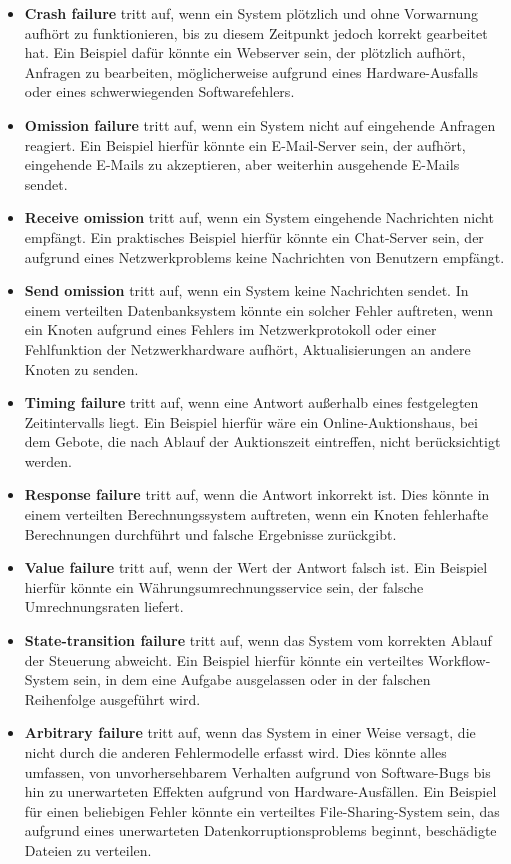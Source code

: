 \documentclass[../vs-script-first-v01.tex]{subfiles}
\begin{document}
\begin{itemize}
\item \textbf{Crash failure} tritt auf, wenn ein System plötzlich und ohne Vorwarnung aufhört zu funktionieren, bis zu diesem Zeitpunkt jedoch korrekt gearbeitet hat. Ein Beispiel dafür könnte ein Webserver sein, der plötzlich aufhört, Anfragen zu bearbeiten, möglicherweise aufgrund eines Hardware-Ausfalls oder eines schwerwiegenden Softwarefehlers.
\item \textbf{Omission failure} tritt auf, wenn ein System nicht auf eingehende Anfragen reagiert. Ein Beispiel hierfür könnte ein E-Mail-Server sein, der aufhört, eingehende E-Mails zu akzeptieren, aber weiterhin ausgehende E-Mails sendet.
\item  \textbf{Receive omission} tritt auf, wenn ein System eingehende Nachrichten nicht empfängt. Ein praktisches Beispiel hierfür könnte ein Chat-Server sein, der aufgrund eines Netzwerkproblems keine Nachrichten von Benutzern empfängt.
\item \textbf{Send omission} tritt auf, wenn ein System keine Nachrichten sendet. In einem verteilten Datenbanksystem könnte ein solcher Fehler auftreten, wenn ein Knoten aufgrund eines Fehlers im Netzwerkprotokoll oder einer Fehlfunktion der Netzwerkhardware aufhört, Aktualisierungen an andere Knoten zu senden.
\item \textbf{Timing failure}  tritt auf, wenn eine Antwort außerhalb eines festgelegten Zeitintervalls liegt. Ein Beispiel hierfür wäre ein Online-Auktionshaus, bei dem Gebote, die nach Ablauf der Auktionszeit eintreffen, nicht berücksichtigt werden.
\item \textbf{Response failure} tritt auf, wenn die Antwort inkorrekt ist. Dies könnte in einem verteilten Berechnungssystem auftreten, wenn ein Knoten fehlerhafte Berechnungen durchführt und falsche Ergebnisse zurückgibt.
\item \textbf{Value failure}  tritt auf, wenn der Wert der Antwort falsch ist. Ein Beispiel hierfür könnte ein Währungsumrechnungsservice sein, der falsche Umrechnungsraten liefert.
\item \textbf{State-transition failure} tritt auf, wenn das System vom korrekten Ablauf der Steuerung abweicht. Ein Beispiel hierfür könnte ein verteiltes Workflow-System sein, in dem eine Aufgabe ausgelassen oder in der falschen Reihenfolge ausgeführt wird.
\item \textbf{Arbitrary failure} tritt auf, wenn das System in einer Weise versagt, die nicht durch die anderen Fehlermodelle erfasst wird. Dies könnte alles umfassen, von unvorhersehbarem Verhalten aufgrund von Software-Bugs bis hin zu unerwarteten Effekten aufgrund von Hardware-Ausfällen. Ein Beispiel für einen beliebigen Fehler könnte ein verteiltes File-Sharing-System sein, das aufgrund eines unerwarteten Datenkorruptionsproblems beginnt, beschädigte Dateien zu verteilen.
\end{itemize}
\end{document}
